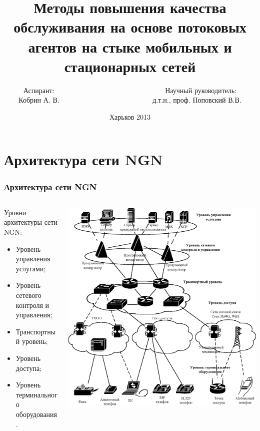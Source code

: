 \documentclass[10pt,pdf,hyperref={unicode}]{beamer}
\title[\theme]{Методы повышения качества обслуживания на основе потоковых агентов на стыке мобильных и стационарных сетей}
\author[Кобрин А. В.]{Аспирант: \ \ \ \ \ \ \ \ \ \ \ \ \ \ \ \ \ \ \ \ \ \ \ \ \
 \ \ \ \ \ \ Научный руководитель: \\Кобрин А. В. \ \ \ \ \ \ \ \ \ \ \ \ \ \ \ \ \ \ \ \ \ \ \ \ \
 \ д.т.н., проф. Поповский В.В.}
\institute[ХНУРЭ]{Харьковский Национальный Университет Радиоэлектроники}
\date{Харьков 2013}
\begin{document}
\begin{frame}
\titlepage
\end{frame}
 
 \section{Архитектура сети NGN}

\begin{frame}
\frametitle{Архитектура сети NGN}
\begin{columns}[T]
\begin{column}{0.45\textwidth}
\begin{exampleblock}
{Уровни архитектуры сети NGN:}
\begin{itemize}
 \item Уровень управления услугами;
 \item Уровень сетевого контроля и управления;
 \item Транспортный уровень;
 \item Уровень доступа;
 \item Уровень терминального оборудования.
\end{itemize}
\end{exampleblock}
\end{column}
\begin{column}{0.5\textwidth}
\includegraphics[width=\columnwidth]{ngn.eps}
\end{column}
\end{columns}
\end{frame}
 
\end{document}
